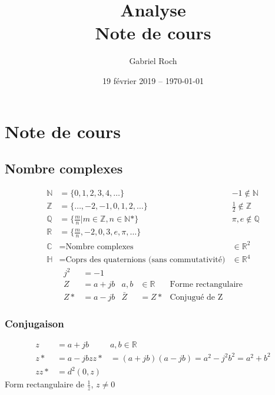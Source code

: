 \documentclass[a4paper,11pt]{report}
\title{Analyse \\ Note de cours}
\author{Gabriel Roch}
\date{19 février 2019 -- \today}
\begin{document}
\maketitle
\tableofcontents

\part{Note de cours}
\chapter{Nombre complexes}

\begin{align*}
   ℕ &= \{0,1,2,3,4,…\} & -1 ∉ ℕ \\
   ℤ &= \{…, -2, -1, 0, 1, 2, …\} & \frac{1}{2} ∉ ℤ \\
   ℚ &= \{\frac{m}{n} | m ∈ ℤ, n ∈ ℕ*\} & \pi, e ∉ ℚ \\
   ℝ &= \{\frac{m}{n}, -2, 0, 3, e, \pi, …\} \\
   ℂ &= \text{Nombre complexes} & ∈ ℝ^2 \\
   ℍ &= \text{Coprs des quaternions (sans commutativité)} & ∈ ℝ^4
\end{align*}
\begin{align*}
   j^2 &= -1 \\
   Z &= a + jb & a,b &∈ ℝ & \text{Forme rectangulaire} \\
   Z* &= a - jb & \bar{Z} &= Z* & \text{Conjugué de Z}
\end{align*}

%
%
%
%
%
%
%
%
%
%
%

\section{Conjugaison}
\begin{align}
   z &= a + jb & a,b \in \mathbb{R} \\
   z* &= a-jb
   z z* &= (a+jb)(a-jb) = a^2 - j^2b^2 = a^2 + b^2 \\
   z z* &= d^2(0,z)
\end{align}
Form rectangulaire de $\frac{1}{z}$, $z \neq 0$
\end{document}
